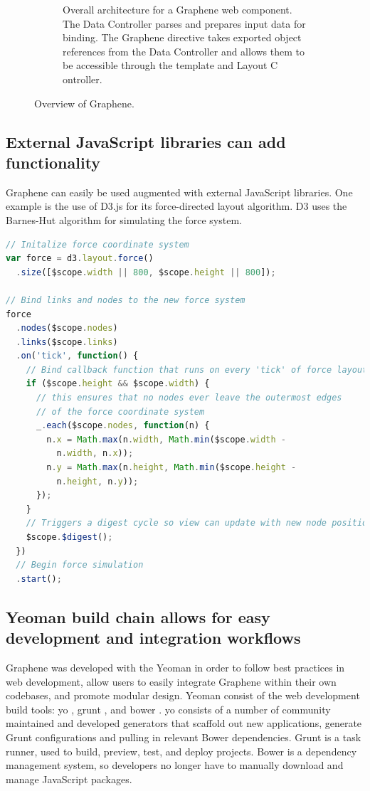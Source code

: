 \begin{figure}
\begin{subfigure}[b]{\textwidth}
    \caption{Overall architecture for a Graphene web component. The Data Controller parses and prepares input data for binding. 
      The Graphene directive takes exported object references from the Data Controller and allows them to be accessible through the template and Layout C      ontroller.}
    \label{Figure:graphene-diagram}
  \end{subfigure}
  \caption{Overview of Graphene.}
  \label{Figure:graphene}
\end{figure}

\subsection{External JavaScript libraries can add functionality}
Graphene can easily be used augmented with external JavaScript libraries.
One example is the use of D3.js \autocite{bostock2014d3} for its force-directed layout algorithm.
D3 uses the Barnes-Hut algorithm for simulating the force system. \autocite{bostock2011d3}

\begin{lstlisting}[language=JavaScript]
// Initalize force coordinate system
var force = d3.layout.force()
  .size([$scope.width || 800, $scope.height || 800]);

// Bind links and nodes to the new force system
force
  .nodes($scope.nodes)
  .links($scope.links)
  .on('tick', function() {
    // Bind callback function that runs on every 'tick' of force layout
    if ($scope.height && $scope.width) {
      // this ensures that no nodes ever leave the outermost edges
      // of the force coordinate system
      _.each($scope.nodes, function(n) {
        n.x = Math.max(n.width, Math.min($scope.width -
          n.width, n.x));
        n.y = Math.max(n.height, Math.min($scope.height -
          n.height, n.y));
      });
    }
    // Triggers a digest cycle so view can update with new node positions
    $scope.$digest();
  })
  // Begin force simulation
  .start();
\end{lstlisting}

\subsection{Yeoman build chain allows for easy development and integration workflows}

Graphene was developed with the Yeoman in order to follow best practices in web development, allow users to easily integrate Graphene within their own codebases, and promote modular design.
Yeoman consist of the web development build tools: yo \autocite{yeoman2014yo}, grunt \autocite{alman2014grunt}, and bower \autocite{twitter2014bower}.
yo consists of a number of community maintained and developed generators that scaffold out new applications, generate Grunt configurations and pulling in relevant Bower dependencies.
Grunt is a task runner, used to build, preview, test, and deploy projects.
Bower is a dependency management system, so developers no longer have to manually download and manage JavaScript packages.

